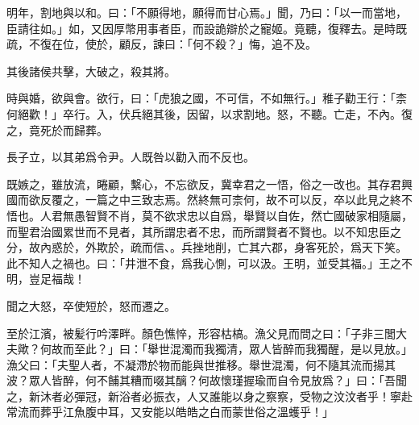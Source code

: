 明年，割地與以和。曰：「不願得地，願得而甘心焉。」聞，乃曰：「以一而當地，臣請往如。」如，又因厚幣用事者臣，而設詭辯於之寵姬。竟聽，復釋去。是時既疏，不復在位，使於，顧反，諫曰：「何不殺？」悔，追不及。

其後諸侯共擊，大破之，殺其將。

時與婚，欲與會。欲行，曰：「虎狼之國，不可信，不如無行。」稚子勸王行：「柰何絕歡！」卒行。入，伏兵絕其後，因留，以求割地。怒，不聽。亡走，不內。復之，竟死於而歸葬。

長子立，以其弟爲令尹。人既咎以勸入而不反也。

既嫉之，雖放流，睠顧，繫心，不忘欲反，冀幸君之一悟，俗之一改也。其存君興國而欲反覆之，一篇之中三致志焉。然終無可柰何，故不可以反，卒以此見之終不悟也。人君無愚智賢不肖，莫不欲求忠以自爲，舉賢以自佐，然亡國破家相隨屬，而聖君治國累世而不見者，其所謂忠者不忠，而所謂賢者不賢也。以不知忠臣之分，故內惑於，外欺於，疏而信、。兵挫地削，亡其六郡，身客死於，爲天下笑。此不知人之禍也。曰：「井泄不食，爲我心惻，可以汲。王明，並受其福。」王之不明，豈足福哉！

聞之大怒，卒使短於，怒而遷之。

至於江濱，被髪行吟澤畔。顏色憔悴，形容枯槁。漁父見而問之曰：「子非三閭大夫歟？何故而至此？」曰：「舉世混濁而我獨清，眾人皆醉而我獨醒，是以見放。」漁父曰：「夫聖人者，不凝滯於物而能與世推移。舉世混濁，何不隨其流而揚其波？眾人皆醉，何不餔其糟而啜其醨？何故懷瑾握瑜而自令見放爲？」曰：「吾聞之，新沐者必彈冠，新浴者必振衣，人又誰能以身之察察，受物之汶汶者乎！寧赴常流而葬乎江魚腹中耳，又安能以皓皓之白而蒙世俗之溫蠖乎！」

